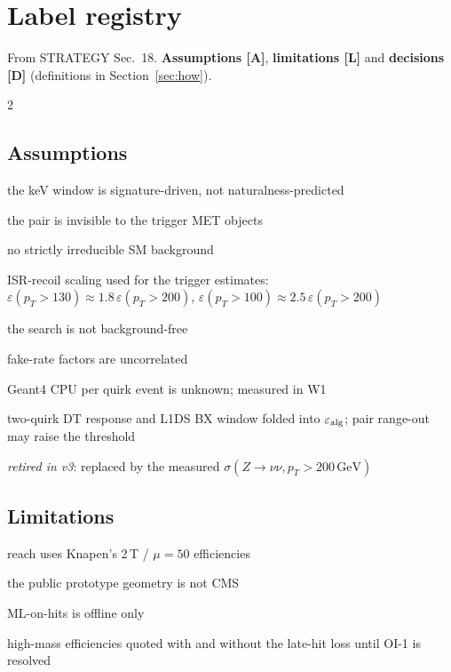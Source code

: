 \documentclass[11pt,a4paper]{article}
\newcommand{\GeV}{\,\mathrm{GeV}}
\begin{document}
\section{Label registry}\label{app:labels}
From STRATEGY Sec.~18. \textbf{Assumptions [A]}, \textbf{limitations [L]} and \textbf{decisions [D]} (definitions in Section~\ref{sec:how}).
{\small\begin{multicols}{2}
\subsection*{Assumptions}\begin{description}[leftmargin=0.9cm,labelwidth=0.8cm,itemsep=0pt]
\item[\textbf{A1}] the keV window is signature-driven, not naturalness-predicted
\item[\textbf{A2}] the pair is invisible to the trigger MET objects
\item[\textbf{A3}] no strictly irreducible SM background
\item[\textbf{A4}] ISR-recoil scaling used for the trigger estimates: $\varepsilon(p_T>130)\approx1.8\,\varepsilon(p_T>200)$, $\varepsilon(p_T>100)\approx2.5\,\varepsilon(p_T>200)$
\item[\textbf{A5}] the search is not background-free
\item[\textbf{A6}] fake-rate factors are uncorrelated
\item[\textbf{A7}] Geant4 CPU per quirk event is unknown; measured in W1
\item[\textbf{A8}] two-quirk DT response and L1DS BX window folded into $\varepsilon_{\rm alg}$; pair range-out may raise the threshold
\item[\textbf{A9}] \emph{retired in v3}: replaced by the measured $\sigma(Z\to\nu\nu,p_T>200\GeV)$
\end{description}
\subsection*{Limitations}\begin{description}[leftmargin=0.9cm,labelwidth=0.8cm,itemsep=0pt]
\item[\textbf{L1}] reach uses Knapen's 2\,T / $\mu=50$ efficiencies
\item[\textbf{L2}] the public prototype geometry is not CMS
\item[\textbf{L3}] ML-on-hits is offline only
\item[\textbf{L4}] high-mass efficiencies quoted with and without the late-hit loss until OI-1 is resolved
\end{description}

\end{multicols}}
\end{document}
